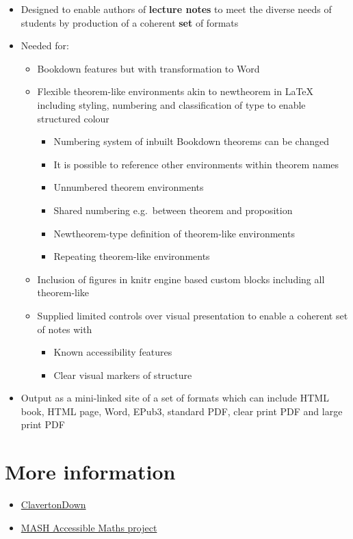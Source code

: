 \documentclass[
  10pt,
  a4paper]{article}
\providecommand{\tightlist}{%
  \setlength{\itemsep}{0pt}\setlength{\parskip}{0pt}}
\begin{document}
\begin{itemize}
\tightlist
\item
  Designed to enable authors of \textbf{lecture notes} to meet the diverse needs of students by production of a coherent \textbf{set} of formats
\item
  Needed for:

  \begin{itemize}
  \tightlist
  \item
    Bookdown features but with transformation to Word
  \item
    Flexible theorem-like environments akin to newtheorem in LaTeX including styling, numbering and classification of type to enable structured colour

    \begin{itemize}
    \tightlist
    \item
      Numbering system of inbuilt Bookdown theorems can be changed
    \item
      It is possible to reference other environments within theorem names
    \item
      Unnumbered theorem environments
    \item
      Shared numbering e.g.~between theorem and proposition
    \item
      Newtheorem-type definition of theorem-like environments
    \item
      Repeating theorem-like environments
    \end{itemize}
  \item
    Inclusion of figures in knitr engine based custom blocks including all theorem-like
  \item
    Supplied limited controls over visual presentation to enable a coherent set of notes with

    \begin{itemize}
    \tightlist
    \item
      Known accessibility features
    \item
      Clear visual markers of structure
    \end{itemize}
  \end{itemize}
\item
  Output as a mini-linked site of a set of formats which can include HTML book, HTML page, Word, EPub3, standard PDF, clear print PDF and large print PDF
\end{itemize}

\hypertarget{more-information}{%
\section{More information}\label{more-information}}

\begin{itemize}
\tightlist
\item
  \href{https://bathmash.github.io/clavertondown/}{ClavertonDown}
\item
  \href{https://www.bath.ac.uk/projects/mathematics-accessibility/}{MASH Accessible Maths project}
\end{itemize}
\end{document}
